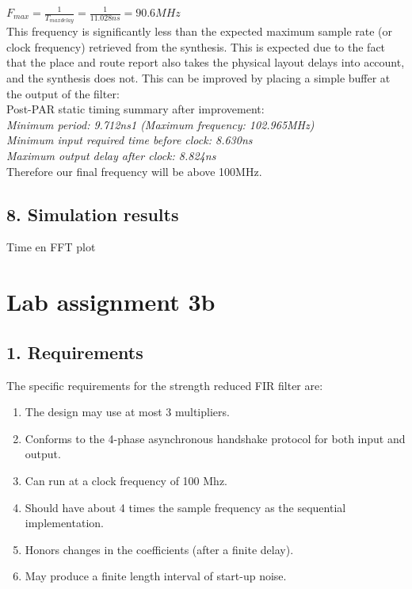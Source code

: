 \documentclass[a4paper,twoside,11pt, fleqn]{article}
\begin{document}
$F_{max} = \frac{1}{T_{max delay}} = \frac{1}{11.028ns} = 90.6MHz$\\

This frequency is significantly less than the expected maximum sample rate (or clock frequency) retrieved from the synthesis. This is expected due to the fact that the place and route report also takes the physical layout delays into account, and the synthesis does not. This can be improved by placing a simple buffer at the output of the filter:\\

Post-PAR static timing summary after improvement:\\
\textit{Minimum period:   9.712ns{1}   (Maximum frequency: 102.965MHz)\\
   Minimum input required time before clock:   8.630ns\\
   Maximum output delay after clock:   8.824ns}\\

Therefore our final frequency will be above 100MHz.


\subsection*{8. Simulation results}
Time en FFT plot


\newpage
\section*{Lab assignment 3b}
\subsection*{1. Requirements}
The specific requirements for the strength reduced FIR filter are:
\begin{enumerate}
\item The design may use at most 3 multipliers.
\item Conforms to the 4-phase asynchronous handshake protocol for both input and output.
\item Can run at a clock frequency of 100 Mhz.
\item Should have about 4 times the sample frequency as the sequential implementation.
\item Honors changes in the coefficients (after a finite delay).
\item May produce a finite length interval of start-up noise.
\end{enumerate}
\end{document}
